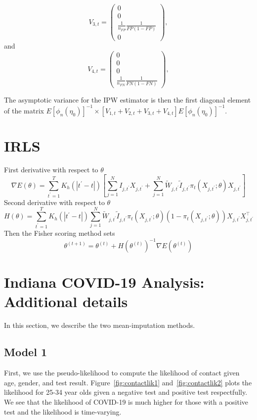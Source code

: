 \documentclass[11pt]{amsart}
\numberwithin{equation}{section}
\theoremstyle{plain}
\begin{document}
$$
V_{3,t} = \left( \begin{array}{c}
0 \\
0 \\
\frac{1}{n_{FP}} \frac{1}{FP(1-FP)} \\
0
\end{array}
\right),
$$
and
$$
V_{4,t} = \left( \begin{array}{c}
0 \\
0 \\
0 \\
\frac{1}{n_{FN}} \frac{1}{FN(1-FN)}
\end{array}
\right),
$$

The asymptotic variance for the IPW estimator is then the first diagonal element of the matrix $E \left[ \phi_n (\eta_0) \right]^{-1} \times \left[ V_{1,t} + V_{2,t} + V_{3,t} + V_{4,t} \right] E \left[ \phi_n (\eta_0) \right]^{-1}$.
\section{IRLS}
\label{app:irls}
First derivative with respect to $\theta$
$$
\nabla E(\theta) = \sum_{t^\prime=1}^T K_h(|t^\prime - t|) \left[ \sum_{j=1}^N I_{j,t^\prime} X_{j,t^\prime} + \sum_{j=1}^N \tilde W_{j,t^\prime} \tilde I_{j,t^\prime} \pi_t (X_{j,t^\prime}; \theta) X_{j,t^\prime} \right]
$$
Second derivative with respect to $\theta$
$$
H(\theta) = \sum_{t^\prime=1}^T K_h(|t^\prime - t|) \sum_{j=1}^N \tilde W_{j,t^\prime} \tilde I_{j,t^\prime} \pi_t (X_{j,t^\prime}; \theta) \left( 1- \pi_t (X_{j,t^\prime}; \theta) \right) X_{j,t^\prime} X_{j,t^\prime}^\top
$$
Then the Fisher scoring method sets
$$
\theta^{(t+1)} = \theta^{(t)} + H \left(\theta^{(t)} \right)^{-1} \nabla E \left(\theta^{(t)} \right)
$$

\section{Indiana COVID-19 Analysis: Additional details}
\label{app:in_add_details}

In this section, we describe the two mean-imputation methods.
\subsection{Model 1}

First, we use the pseudo-likelihood to compute the likelihood of contact given age, gender, and test result.  Figure~\ref{fig:contactlik1} and~\ref{fig:contactlik2} plots the likelihood for 25-34 year olds given a negative test and positive test respectfully.  We see that the likelihood of COVID-19 is much higher for those with a positive test and the likelihood is time-varying.
\end{document}
